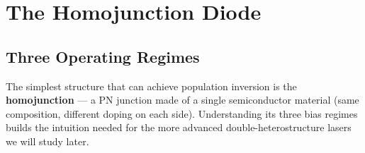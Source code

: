 \section{The Homojunction Diode}

\subsection{Three Operating Regimes}

The simplest structure that can achieve population inversion is the \textbf{homojunction} — a PN junction made of a single semiconductor material (same composition, different doping on each side). Understanding its three bias regimes builds the intuition needed for the more advanced double-heterostructure lasers we will study later.


